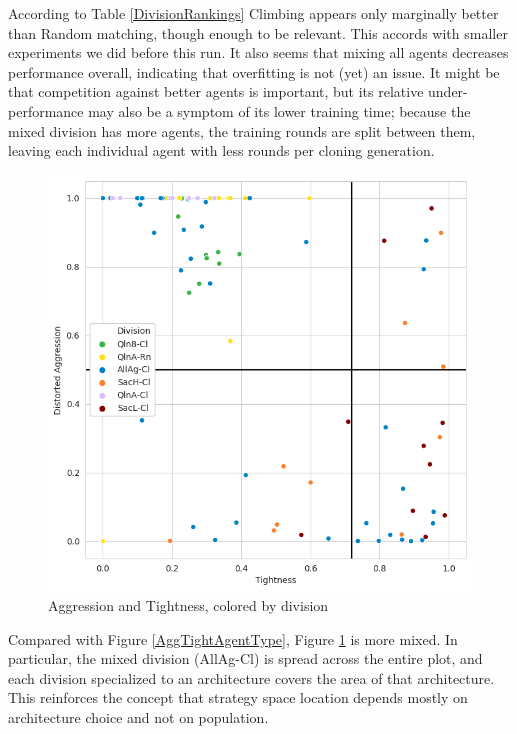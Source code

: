 According to Table \ref{DivisionRankings} Climbing appears only marginally better than Random matching, though enough to be relevant. This accords with smaller experiments we did before this run. It also seems that mixing all agents decreases performance overall, indicating that overfitting is not (yet) an issue. It might be that competition against better agents is important, but its relative under-performance may also be a symptom of its lower training time; because the mixed division has more agents, the training rounds are split between them, leaving each individual agent with less rounds per cloning generation.

\begin{figure}[H]
\centering
    \includegraphics[width=0.8\linewidth]{Results/figures/traditional_scatterplot_Division.png}
\caption{Aggression and Tightness, colored by division}
\label{AggTightDivision}
\end{figure}

Compared with Figure \ref{AggTightAgentType}, Figure \ref{AggTightDivision} is more mixed. In particular, the mixed division (AllAg-Cl) is spread across the entire plot, and each division specialized to an architecture covers the area of that architecture. This reinforces the concept that strategy space location depends mostly on architecture choice and not on population.

